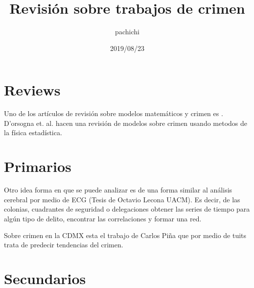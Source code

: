 \documentclass[onecolumn,12pt,letterpaper]{article}
\title{Revisión sobre trabajos de crimen}
\author{pachichi}
\date{2019/08/23}
\begin{document}
\maketitle

\section{Reviews}

Uno de los artículos de revisión sobre modelos matemáticos y crimen es \cite{gordon_random_2010}. D'orsogna et. al.  \cite{dorsogna_statistical_2015} hacen una revisión de modelos sobre crimen usando metodos de la física estadística.

\section{Primarios}



Otro idea forma en que se puede analizar es de una forma similar al análisis cerebral por medio de ECG (Tesis de Octavio Lecona UACM). Es decir, de las colonias, cuadrantes de seguridad o delegaciones obtener las series de tiempo para algún tipo de delito, encontrar las correlaciones y formar una red. 


Sobre crimen en la CDMX esta el trabajo de Carlos Piña\cite{pina-garcia_exploring_2019} que por medio de tuits trata de predecir tendencias del crimen.
\section{Secundarios}








\end{document}
